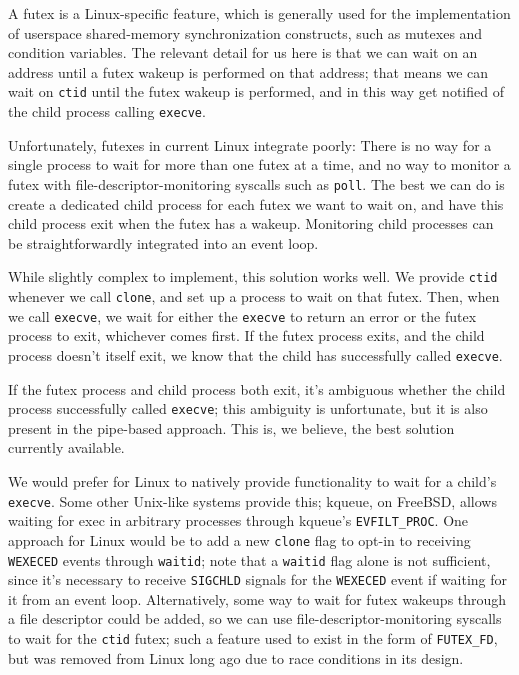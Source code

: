 \documentclass{acmart}
\begin{document}
A futex is a Linux-specific feature,
which is generally used for the implementation of userspace shared-memory synchronization constructs,
such as mutexes and condition variables.
The relevant detail for us here is that we can wait on an address
until a futex wakeup is performed on that address;
that means we can wait on \texttt{ctid} until the futex wakeup is performed,
and in this way get notified of the child process calling \texttt{execve}.

Unfortunately, futexes in current Linux integrate poorly:
There is no way for a single process to wait for more than one futex at a time,
and no way to monitor a futex with file-descriptor-monitoring syscalls such as \texttt{poll}.
The best we can do is create a dedicated child process for each futex we want to wait on,
and have this child process exit when the futex has a wakeup.
Monitoring child processes can be straightforwardly integrated into an event loop.

While slightly complex to implement, this solution works well.
We provide \texttt{ctid} whenever we call \texttt{clone},
and set up a process to wait on that futex.
Then, when we call \texttt{execve},
we wait for either the \texttt{execve} to return an error or the futex process to exit,
whichever comes first.
If the futex process exits,
and the child process doesn't itself exit,
we know that the child has successfully called \texttt{execve}.

If the futex process and child process both exit,
it's ambiguous whether the child process successfully called \texttt{execve};
this ambiguity is unfortunate, but it is also present in the pipe-based approach.
This is, we believe, the best solution currently available.

We would prefer for Linux to natively provide functionality to wait for a child's \texttt{execve}.
Some other Unix-like systems provide this;
kqueue, on FreeBSD, allows waiting for exec in arbitrary processes through kqueue's \verb|EVFILT_PROC|.
One approach for Linux would be to add a new \texttt{clone} flag to opt-in to receiving \texttt{WEXECED} events through \texttt{waitid};
note that a \texttt{waitid} flag alone is not sufficient,
since it's necessary to receive \texttt{SIGCHLD} signals for the \texttt{WEXECED} event if waiting for it from an event loop.
Alternatively, some way to wait for futex wakeups through a file descriptor could be added,
so we can use file-descriptor-monitoring syscalls to wait for the \texttt{ctid} futex;
such a feature used to exist in the form of \verb|FUTEX_FD|,
but was removed from Linux long ago due to race conditions in its design.
\end{document}
